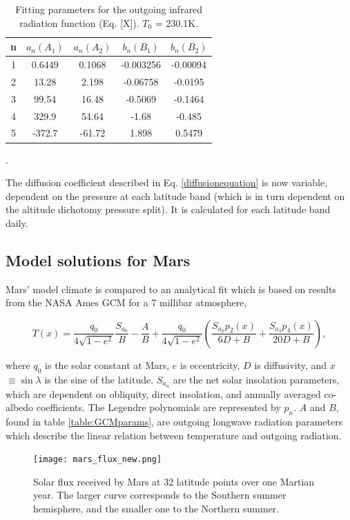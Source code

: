 \documentclass[12pt,onecolumn]{revtex4-2}    %
\begin{document}
\begin{table}
\begin{tabular}{ccccc} \toprule
    n & $a_{n} (A_{1})$ & $a_{n} (A_{2})$ & $b_{n} (B_{1})$ & $b_{n} (B_{2})$ \\ \midrule
    1  & 0.6449 & 0.1068 & -0.003256 & -0.00094 \\
    2  & 13.28 & 2.198 & -0.06758 & -0.0195 \\
    3  & 99.54  & 16.48 & -0.5069 & -0.1464 \\
    4 & 329.9 & 54.64 & -1.68 & -0.485      \\
    5 & -372.7 & -61.72 & 1.898 & 0.5479
\\

\bottomrule
\end{tabular}
\caption{Fitting parameters for the outgoing infrared radiation function (Eq. [X]). $T_{0}$ = 230.1K. }.
\end{table}

The diffusion coefficient described in Eq. \ref{diffusionequation} is now variable, dependent on the pressure at each latitude band (which is in turn dependent on the altitude dichotomy pressure split). It is calculated for each latitude band daily.

\subsection{Model solutions for Mars}
Mars' model climate is compared to an analytical fit \cite{KH18} which is based on results from the NASA Ames GCM for a 7 millibar atmosphere, 

\begin{equation}
T(x) = \frac{q_{0}}{4 \sqrt{1 - e^{2}}} \frac{S_{a_{0}}}{B} - \frac{A}{B} + \frac{q_{0}}{4 \sqrt{1 - e^{2}}} (\frac{S_{a_{2}}p_{2}(x)}{6D+B} + \frac{S_{a_{4}}p_{4}(x)}{20D+B}),
\end{equation}

where $q_{0}$ is the solar constant at Mars, $e$ is eccentricity, $D$ is diffusivity, and $x$ $\equiv \sin\lambda$ is the sine of the latitude. $S_{a_{n}}$ are the net solar insolation parameters, which are dependent on obliquity, direct insolation, and annually averaged co-albedo coefficients. The Legendre polynomials are represented by $p_{n}$. $A$ and $B$, found in table \ref{table:GCMparams}, are outgoing longwave radiation parameters which describe the linear relation between temperature and outgoing radiation.

\begin{figure}[h]
\centering
\texttt{[image: mars\_flux\_new.png]}
\caption{Solar flux received by Mars at 32 latitude points over one Martian year. The larger curve corresponds to the Southern summer hemisphere, and the smaller one to the Northern summer.}
\label{fig:marsflux}
\end{figure}
\end{document}

